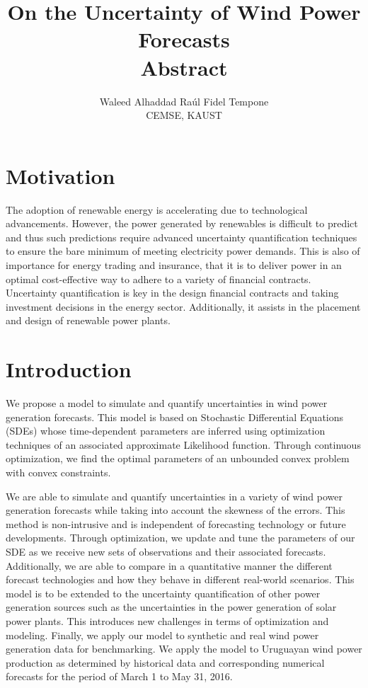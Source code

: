 \documentclass[a4paper, 12pt]{article}
\title{On the Uncertainty of Wind Power Forecasts \\ Abstract}
\author{Waleed Alhaddad \quad  Ra\'ul Fidel Tempone \\ CEMSE, KAUST}
\date{}
\begin{document}
\maketitle

\section{Motivation}

The adoption of renewable energy is accelerating due to technological advancements. However, the power generated by renewables is difficult to predict and thus such predictions require advanced uncertainty quantification techniques to ensure the bare minimum of meeting electricity power demands. This is also of importance for energy trading and insurance, that it is to deliver power in an optimal cost-effective way to adhere to a variety of financial contracts. Uncertainty quantification is key in the design  financial contracts and taking investment decisions in the energy sector. Additionally, it assists in the placement and design of renewable power plants.

\section{Introduction}

	We propose a model to simulate and quantify uncertainties in wind power generation forecasts. This model is based on Stochastic Differential Equations (SDEs) whose time-dependent parameters are inferred using optimization techniques of an associated approximate Likelihood function. Through continuous optimization, we find the optimal parameters of an unbounded convex problem with convex constraints.

	We are able to simulate and quantify uncertainties in a variety of wind power generation forecasts while taking into account the skewness of the errors. This method is non-intrusive and is independent of forecasting technology or future developments. Through optimization, we update and tune the parameters of our SDE as we receive new sets of observations and their associated forecasts. Additionally, we are able to compare in a quantitative manner the different forecast technologies and how they behave in different real-world scenarios. This model is to be extended to the uncertainty quantification of other power generation sources such as the uncertainties in the power generation of solar power plants. This introduces new challenges in terms of optimization and modeling. Finally, we apply our model to synthetic and real wind power generation data for benchmarking. We apply the model to Uruguayan wind power production as determined by historical data and corresponding numerical forecasts for the period of March 1 to May 31, 2016.
\end{document}
